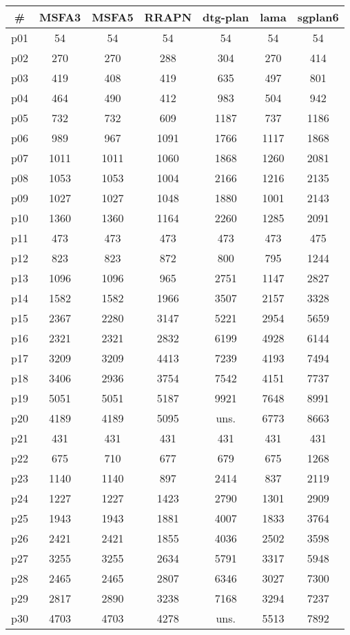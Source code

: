 \begin{tabular}{ccccccc}
\toprule
\textbf{\#} & \textbf{MSFA3} & \textbf{MSFA5} & \textbf{RRAPN} & \textbf{dtg-plan} & \textbf{lama} & \textbf{sgplan6}\\
\midrule
p01 & 54 & 54 & 54 & 54 & 54 & 54\\
p02 & 270 & 270 & 288 & 304 & 270 & 414\\
p03 & 419 & 408 & 419 & 635 & 497 & 801\\
p04 & 464 & 490 & 412 & 983 & 504 & 942\\
p05 & 732 & 732 & 609 & 1187 & 737 & 1186\\
p06 & 989 & 967 & 1091 & 1766 & 1117 & 1868\\
p07 & 1011 & 1011 & 1060 & 1868 & 1260 & 2081\\
p08 & 1053 & 1053 & 1004 & 2166 & 1216 & 2135\\
p09 & 1027 & 1027 & 1048 & 1880 & 1001 & 2143\\
p10 & 1360 & 1360 & 1164 & 2260 & 1285 & 2091\\
p11 & 473 & 473 & 473 & 473 & 473 & 475\\
p12 & 823 & 823 & 872 & 800 & 795 & 1244\\
p13 & 1096 & 1096 & 965 & 2751 & 1147 & 2827\\
p14 & 1582 & 1582 & 1966 & 3507 & 2157 & 3328\\
p15 & 2367 & 2280 & 3147 & 5221 & 2954 & 5659\\
p16 & 2321 & 2321 & 2832 & 6199 & 4928 & 6144\\
p17 & 3209 & 3209 & 4413 & 7239 & 4193 & 7494\\
p18 & 3406 & 2936 & 3754 & 7542 & 4151 & 7737\\
p19 & 5051 & 5051 & 5187 & 9921 & 7648 & 8991\\
p20 & 4189 & 4189 & 5095 & uns. & 6773 & 8663\\
p21 & 431 & 431 & 431 & 431 & 431 & 431\\
p22 & 675 & 710 & 677 & 679 & 675 & 1268\\
p23 & 1140 & 1140 & 897 & 2414 & 837 & 2119\\
p24 & 1227 & 1227 & 1423 & 2790 & 1301 & 2909\\
p25 & 1943 & 1943 & 1881 & 4007 & 1833 & 3764\\
p26 & 2421 & 2421 & 1855 & 4036 & 2502 & 3598\\
p27 & 3255 & 3255 & 2634 & 5791 & 3317 & 5948\\
p28 & 2465 & 2465 & 2807 & 6346 & 3027 & 7300\\
p29 & 2817 & 2890 & 3238 & 7168 & 3294 & 7237\\
p30 & 4703 & 4703 & 4278 & uns. & 5513 & 7892\\
\bottomrule
\end{tabular}

